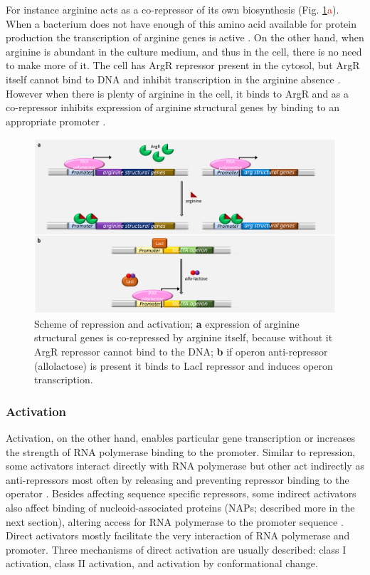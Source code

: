 For instance arginine acts as a co-repressor of its own biosynthesis (Fig. \ref{dir}\textcolor{red}{a}).
When a bacterium does not have enough of this amino acid available for protein production the transcription of arginine genes is active \cite{charlier2004biosynthesis, caldara2006arginine}.
On the other hand, when arginine is abundant in the culture medium, and thus in the cell, there is no need to make more of it.
The cell has ArgR repressor present in the cytosol, but ArgR itself cannot bind to DNA and inhibit transcription in the arginine absence \cite{clark2005molecular, caldara2006arginine}.
However when there is plenty of arginine in the cell, it binds to ArgR and as a co-repressor inhibits expression of arginine structural genes by binding to an appropriate promoter \cite{charlier1992arginine, charlier2004biosynthesis, clark2005molecular}.

\begin{figure}[ht]
  \centering
  \includegraphics[scale=0.27]{text/Pictures/DirectSignaling.png}
    \caption{Scheme of repression and activation; \textbf{a} expression of arginine structural genes is co-repressed by arginine itself, because without it ArgR repressor cannot bind to the DNA; \textbf{b} if  operon anti-repressor (allolactose) is present it binds to LacI repressor and induces  operon transcription.}
    \label{dir}
\end{figure}

\subsubsection{Activation}
Activation, on the other hand, enables particular gene transcription or increases the strength of RNA polymerase binding to the promoter.
Similar to repression, some activators interact directly with RNA polymerase but other act indirectly as anti-repressors most often by releasing and preventing repressor binding to the operator \cite{frederix2011co}.
Besides affecting sequence specific repressors, some indirect activators also affect binding of nucleoid-associated proteins (NAPs; described more in the next section), altering access for RNA polymerase to the promoter sequence \cite{santana2001transcriptional}.
Direct activators mostly facilitate the very interaction of RNA polymerase and promoter.
Three mechanisms of direct activation are usually described: class I activation, class II activation, and activation by conformational change.


